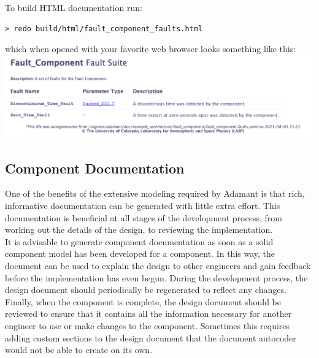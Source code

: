 To build HTML documentation run:

\vspace{5mm} %
\begin{verbatim}
> redo build/html/fault_component_faults.html
\end{verbatim}
\vspace{5mm} %

which when opened with your favorite web browser looks something like this: \\

\vspace{5mm} %
\includegraphics[width=\textwidth]{images/faultshtml.png}
\vspace{5mm} %

\subsection{Component Documentation} \label{Component Documentation}

One of the benefits of the extensive modeling required by Adamant is that rich, informative documentation can be generated with little extra effort. This documentation is beneficial at all stages of the development process, from working out the details of the design, to reviewing the implementation. \\

It is advisable to generate component documentation as soon as a solid component model has been developed for a component. In this way, the document can be used to explain the design to other engineers and gain feedback before the implementation has even begun. During the development process, the design document should periodically be regenerated to reflect any changes. Finally, when the component is complete, the design document should be reviewed to ensure that it contains all the information necessary for another engineer to use or make changes to the component. Sometimes this requires adding custom sections to the design document that the document autocoder would not be able to create on its own. \\

